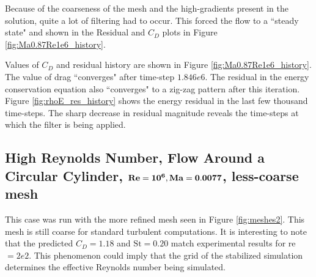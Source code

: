 Because of the coarseness of the mesh and the high-gradients present in the solution, quite a lot of filtering had to occur. This forced the flow to a ``steady state" and shown in the Residual and $C_D$ plots in Figure \ref{fig:Ma0.87Re1e6_history}.

\begin{figure*}
\hspace{-1cm}
\hfill
{}

\hspace{-1cm}
\hfill
{}
\caption{Flow past a cylinder. \gls{re}$= 1e6$, \gls{ma} $= 0.87, p = 4$}
\label{fig:Ma0.87Re1e6}

\end{figure*}

Values of $C_D$ and residual history are shown in Figure \ref{fig:Ma0.87Re1e6_history}. The value of drag ``converges" after time-step $1.846e6$. The residual in the energy conservation equation also ``converges" to a zig-zag pattern after this iteration. Figure \ref{fig:rhoE_res_history} shows the energy residual in the last few thousand time-steps. The sharp decrease in residual magnitude reveals the time-steps at which the filter is being applied.

\begin{figure*}
\hfill
{}
\caption{History of $C_D$ and energy residual of simulation in Figure \ref{fig:Ma0.87Re1e6}}
\label{fig:Ma0.87Re1e6_history}

\end{figure*}

\subsection{High Reynolds Number, Flow Around a Circular Cylinder, $\bf Re = 10^6, Ma = 0.0077$, less-coarse mesh}
This case was run with the more refined mesh seen in Figure \ref{fig:meshes2}. This mesh is still coarse for standard turbulent computations. It is interesting to note that the predicted $C_D = 1.18$ and $\mathrm{St} = 0.20$ match experimental results for \gls{re}$= 2e2$. This phenomenon could imply that the grid of the stabilized simulation determines the effective Reynolds number being simulated.

